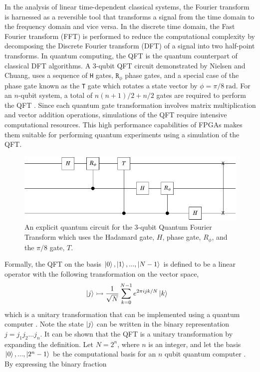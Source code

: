 In the analysis of linear time-dependent classical systems, the Fourier transform is harnessed as a reversible tool that transforms a signal from the time domain to the frequency domain and vice versa. In the discrete time domain, the Fast Fourier transform (FFT) is performed to reduce the computational complexity by decomposing the Discrete Fourier transform (DFT) of a signal into two half-point transforms. In quantum computing, the QFT is the quantum counterpart of classical DFT algorithms. A 3-qubit QFT circuit demonstrated by Nielsen and Chuang, uses a sequence of \texttt{H} gates, $\texttt{R}_\phi$ phase gates, and a special case of the phase gate known as the \texttt{T} gate which rotates a state vector by $\phi=\pi/8~\si{\radian}$. For an $n$-qubit system, a total of $n(n+1)/2+n/2$ gates are required to perform the QFT \cite{Nielsen2010}. Since each quantum gate transformation involves matrix multiplication and vector addition operations, simulations of the QFT require intensive computational resources. This high performance capabilities of FPGAs makes them suitable for performing quantum experiments using a simulation of the QFT. 
\begin{figure}[!ht]
	\centering
	\includegraphics[width=1.0\linewidth]{body/ch3/figs/nielsen-qft}
	\caption[Nielsen 3-qubit QFT.]{An explicit quantum circuit for the 3-qubit Quantum Fourier Transform which uses the Hadamard gate, $H$, phase gate, $R_\phi$, and the $\pi/8$ gate, $T$.}
	\label{fig:nielsen-qft}
\end{figure}
Formally, the QFT on the basis $\ket{0}, \ket{1}, ...,\ket{N-1}$ is defined to be a linear operator with the following transformation on the vector space, 
\begin{align}\label{eqn:qft}
	\ket{j}	& \rightarrowtail \frac{1}{\sqrt{N}} \sum_{k=0}^{N-1} e^{2\pi i j k/N}\ket{k}
\end{align}
which is a unitary transformation that can be implemented using a quantum computer \cite{Nielsen2010}. Note the state $\ket{j}$ can be written in the binary representation $j = j_1j_2...j_n$. It can be shown that the QFT is a unitary transformation by expanding the definition. Let $N=2^n$, where $n$ is an integer, and let the basis $\ket{0},...,\ket{2^n - 1}$ be the computational basis for an $n$ qubit quantum computer \cite{Nielsen2010}. By expressing the binary fraction 
